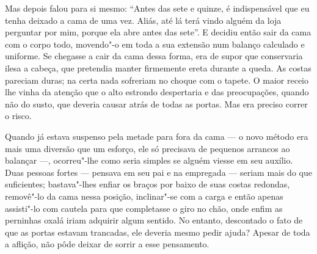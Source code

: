 Mas depois falou para si mesmo: “Antes das sete e quinze, é indispensável
que eu tenha deixado a cama de uma vez. Aliás, até lá terá vindo alguém da
loja perguntar por mim, porque ela abre antes das sete”. E decidiu então
sair da cama com o corpo todo, movendo"-o em toda a sua extensão num
balanço calculado e uniforme. Se chegasse a cair da cama dessa forma, era
de supor que conservaria ilesa a cabeça, que pretendia manter firmemente
ereta durante a queda. As costas pareciam duras; na certa nada sofreriam
no choque com o tapete. O maior receio lhe vinha da atenção que o alto
estrondo despertaria e das preocupações, quando não do susto, que deveria
causar atrás de todas as portas. Mas era preciso correr o risco.

Quando já estava suspenso pela metade para fora da cama --- o novo método
era mais uma diversão que um esforço, ele só precisava de pequenos
arrancos ao balançar ---, ocorreu"-lhe como seria simples se alguém viesse em
seu auxílio. Duas pessoas fortes --- pensava em seu pai e na empregada ---
seriam mais do que suficientes; bastava"-lhes enfiar os braços por baixo de
suas costas redondas, removê"-lo da cama nessa posição, inclinar"-se com a
carga e então apenas assisti"-lo com cautela para que completasse o giro no
chão, onde enfim as perninhas oxalá iriam adquirir algum sentido. No
entanto, descontado o fato de que as portas estavam trancadas, ele deveria
mesmo pedir ajuda? Apesar de toda a aflição, não pôde deixar de sorrir a
esse pensamento.

